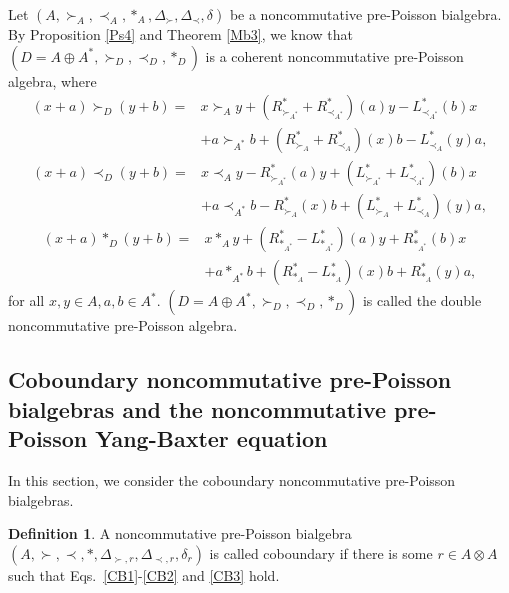 \documentclass[12pt]{amsart}
\theoremstyle{definition}
\newtheorem{defi}[thm]{Definition}
\begin{document}
Let $(A, \succ_A,\prec_A,\ast_A,\Delta_{\succ},\Delta_{\prec},\delta)$ be a noncommutative pre-Poisson bialgebra. 
By Proposition \ref{Ps4} and Theorem \ref{Mb3}, we know that $(D=A\oplus A^{*},\succ_{D},\prec_{D},\ast_{D})$
 is a coherent noncommutative pre-Poisson algebra, where
 \begin{align}\label{Db1}(x+a)\succ_{D}(y+b)=&x\succ_A y+( R_{\succ_{A^*}}^{*}+R_{\prec_{A^*}}^{*})
(a)y-L_{\prec_{A^*}}^{*}
(b)x\\&+a\succ_{A^*}b+(R_{\succ_A}^{*}+R_{\prec_A}^{*})(x)b-L_{\prec_A}^{*}(y)a\nonumber
,\end{align}
 \begin{align}\label{Db2}(x+a)\prec_{D}(y+b)=&x\prec_A y-R_{\succ_{A^*}}^{*}
(a)y+(L_{\succ_{A^*}}^{*}+L_{\prec_{A^*}}^{*})
(b)x\\&+a\prec_{A^*}b-R_{\succ_A}^{*}(x)b+(L_{\succ_A}^{*}+L_{\prec_A}^{*})(y)a\nonumber
,\end{align}
 \begin{align}\label{Db3}(x+a)\ast_{D}(y+b)=&x\ast_A y+(R^{*}_{\ast_{A^*}}-L_{\ast_{A^*}}^{*})
(a)y+R^{*}_{\ast_{A^*}}
(b)x\\&+a\ast_{A^*}b+(R^{*}_{\ast_A}-L_{\ast_A}^{*})(x)b+R^{*}_{\ast_A}(y)a\nonumber
,\end{align}
for all $x,y\in A,a,b\in A^{*}$.
$(D=A\oplus A^{*},\succ_{D},\prec_{D},\ast_{D})$ is called the double noncommutative pre-Poisson algebra. 



\subsection{Coboundary noncommutative pre-Poisson bialgebras and the noncommutative pre-Poisson Yang-Baxter equation}

In this section, we consider the coboundary noncommutative pre-Poisson
bialgebras. 

\begin{defi} A noncommutative pre-Poisson bialgebra $(A, \succ,\prec,\ast,\Delta_{\succ,r},\Delta_{\prec,r},\delta_{r})$ 
is called coboundary if there is some
$r\in A\otimes A$ such that Eqs.~\eqref{CB1}-\eqref{CB2} and \eqref{CB3} hold.
\end{defi}
\end{document}
